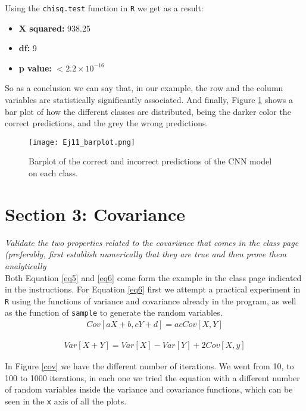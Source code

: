\documentclass{article}
\begin{document}
Using the \texttt{chisq.test} \cite{chitest} function in \texttt{R} we get as a result:

\begin{itemize}
\item \textbf{X squared:} 938.25
\item \textbf{df:} 9
\item \textbf{p value:} $< 2.2\times 10^{-16}$
\end{itemize}

So as a conclusion we can say that, in our example, the row and the column variables are statistically significantly associated. And finally, Figure \ref{figextra} shows a bar plot of how the different classes are distributed, being the darker color the correct predictions, and the grey the wrong predictions.  \\

\begin{figure}[]
  \centering
  \texttt{[image: Ej11\_barplot.png]}  
	\caption{Barplot of the correct and incorrect predictions of the CNN model on each class.}
\label{figextra}
\end{figure}

\section{Section 3: Covariance}
\textit{Validate the two properties related to the covariance that comes in the class page (preferably, first establish numerically that they are true and then prove them analytically}\\

Both Equation \ref{eq5} and \ref{eq6} come form the example in the class page indicated in the instructions. For Equation \ref{eq6} first we attempt a practical experiment in \texttt{R} using the functions of variance and covariance already in the program, as well as the function of \texttt{sample} to generate the random variables.\\


 \begin{eqnarray}
\label{eq5}
Cov[aX + b, cY + d] =  acCov[X, Y]
\end{eqnarray}

 \begin{eqnarray}
\label{eq6}
Var[X + Y] =  Var[X] - Var[Y] + 2Cov[X, y]
\end{eqnarray}

In Figure \ref{cov} we have the different number of iterations. We went from 10, to 100 to 1000 iterations, in each one we tried the equation with a different number of random variables inside the variance and covariance functions, which can be seen in the \texttt{x} axis of all the plots.\\
\end{document}
